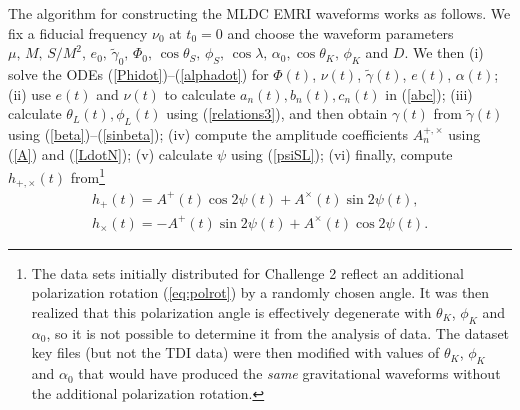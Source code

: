 \documentclass{iopart}
\begin{document}
The algorithm for constructing the MLDC EMRI waveforms works as follows. We fix a fiducial frequency $\nu_0$ at $t_0 = 0$ and choose the waveform parameters $\mu,\, M,\,S/M^2,\,e_0,\,\tilde\gamma_0,\,\Phi_0,\,\cos\theta_S,\,\phi_S,\,\cos\lambda,\,\alpha_0,\cos\theta_K,\,\phi_K$ and $D$. We then (i) solve the ODEs (\ref{Phidot})--(\ref{alphadot}) for $\Phi(t)$, $\nu(t)$, $\tilde\gamma(t)$, $e(t)$, $\alpha(t)$; (ii) use $e(t)$ and $\nu(t)$ to calculate $a_n(t), b_n(t), c_n(t)$ in (\ref{abc}); (iii) calculate $\theta_L(t),\phi_L(t)$ using (\ref{relations3}), and then obtain $\gamma(t)$ from $\tilde\gamma(t)$ using (\ref{beta})--(\ref{sinbeta}); (iv) compute the amplitude coefficients $A_n^{+,\times}$ using (\ref{A}) and (\ref{LdotN}); (v) calculate $\psi$ using (\ref{psiSL}); (vi) finally, compute $h_{+,\times}(t)$ from\footnote{The data sets initially distributed for Challenge 2 reflect an additional polarization rotation (\ref{eq:polrot}) by a randomly chosen angle. It was then realized that this polarization angle is effectively degenerate with $\theta_K$, $\phi_K$ and $\alpha_0$, so it is not possible to determine it from the analysis of data. The dataset key files (but not the TDI data) were then modified with values of $\theta_K$, $\phi_K$ and $\alpha_0$ that would have produced the \emph{same} gravitational waveforms without the additional polarization rotation.}
\begin{eqnarray}\label{final}
h_+(t) = A^+(t) \cos 2\psi(t) + A^{\times}(t) \sin 2\psi(t), \nonumber \\
h_{\times}(t) = - A^+(t) \sin 2\psi(t) + A^{\times}(t) \cos 2\psi(t).
\end{eqnarray}
\end{document}
